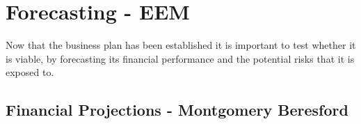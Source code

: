 \documentclass[11pt]{article}		%
\newcommand{\sectref}[1]{\hyperref[#1]{Section \ref*{#1}}}     %
\begin{document}
            
 	\section{Forecasting - EEM}
 	
 	Now that the business plan has been established it is important to test whether it is viable, by forecasting its financial performance and the potential risks that it is exposed to.
 	\label{forecasting}
 
	        \subsection[Financial Projections]{Financial Projections - Montgomery Beresford}
		        	        \label{financialModels}
	        	        
\end{document}
